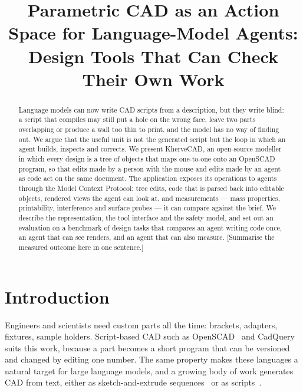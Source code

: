 \documentclass[lineno]{asmejour}
\begin{document}
\title{Parametric CAD as an Action Space for Language-Model Agents: Design Tools That Can Check Their Own Work}



\begin{abstract}
Language models can now write CAD scripts from a description, but they write blind: a script that compiles may still put a hole on the wrong face, leave two parts overlapping or produce a wall too thin to print, and the model has no way of finding out. We argue that the useful unit is not the generated script but the loop in which an agent builds, inspects and corrects. We present KherveCAD, an open-source modeller in which every design is a tree of objects that maps one-to-one onto an OpenSCAD program, so that edits made by a person with the mouse and edits made by an agent as code act on the same document. The application exposes its operations to agents through the Model Context Protocol: tree edits, code that is parsed back into editable objects, rendered views the agent can look at, and measurements --- mass properties, printability, interference and surface probes --- it can compare against the brief. We describe the representation, the tool interface and the safety model, and set out an evaluation on a benchmark of design tasks that compares an agent writing code once, an agent that can see renders, and an agent that can also measure. [Summarise the measured outcome here in one sentence.]
\end{abstract}

\maketitle

\section{Introduction}

Engineers and scientists need custom parts all the time: brackets, adapters, fixtures, sample holders. Script-based CAD such as OpenSCAD~\cite{openscad} and CadQuery~\cite{cadquery} suits this work, because a part becomes a short program that can be versioned and changed by editing one number. The same property makes these languages a natural target for large language models, and a growing body of work generates CAD from text, either as sketch-and-extrude sequences~\cite{wu2023cadllm,khan2024text2cad} or as scripts~\cite{xie2025textcadquery,guan2025cadcoder}.
\end{document}
